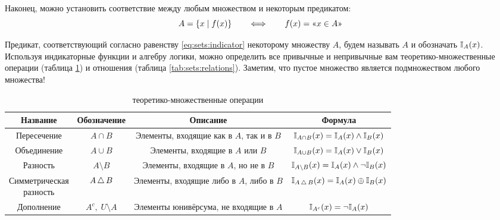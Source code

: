 Наконец, можно установить соответствие между любым множеством и некоторым предикатом:
\begin{equation}
    \label{eq:sets:indicator}
    A = \{ x \mid f(x) \} \qquad \Longleftrightarrow \qquad f(x) = \text{<<$ x \in A $>>}
\end{equation}

Предикат, соответствующий согласно равенству \eqref{eq:sets:indicator} некоторому множеству $ A $, будем называть  $ A $ и обозначать $ \mathbb{I}_A(x) $.
Используя индикаторные функции и алгебру логики,
можно определить все привычные и непривычные вам теоретико-множественные операции (таблица \ref{tab:sets:operations}) и отношения (таблица \ref{tab:sets:relations}).
Заметим, что пустое множество является подмножеством любого множества!

\begin{table}[ht!]
    \center
    \begin{tabular}{|c|c|c|c|}
        \hline
        Название & Обозначение & Описание & Формула \\
        \hline
        \hline
        Пересечение & $ A \cap B $      & \makecell{Элементы, входящие \\ как в $ A $, так и в $ B $}      & $ \mathbb{I}_{A \cap B}(x) = \mathbb{I}_A(x) \wedge \mathbb{I}_B(x) $ \\
        Объединение & $ A \cup B $      & \makecell{Элементы, входящие \\ в $ A $ или $ B $}               & $ \mathbb{I}_{A \cup B}(x) = \mathbb{I}_A(x) \vee \mathbb{I}_B(x) $ \\
        Разность    & $ A \setminus B $ & \makecell{Элементы, входящие \\ в $ A $, но не в $ B $}          & $ \mathbb{I}_{A \setminus B}(x) = \mathbb{I}_A(x) \wedge \neg \mathbb{I}_B(x) $ \\
        \makecell{Симметрическая \\ разность} & $ A \,\triangle\, B $ & \makecell{Элементы, входящие \\ либо в $ A $, либо в $ B $} & $ \mathbb{I}_{A \,\triangle\, B}(x) = \mathbb{I}_A(x) \oplus \mathbb{I}_B(x) $ \\
        Дополнение  & $ A^c, \; U \setminus A $ & \makecell{Элементы юнивёрсума, \\ не входящие в $ A $}    & $ \mathbb{I}_{A^c}(x) = \neg \mathbb{I}_A(x) $ \\
        \hline
    \end{tabular}
    \caption{теоретико-множественные операции}
    \label{tab:sets:operations}
\end{table}

